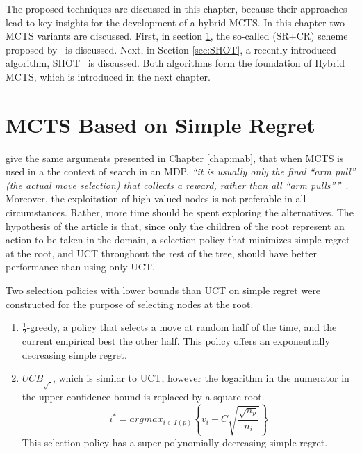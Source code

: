\documentclass{kecsmstr}
\begin{document}
\vspace{2 mm}
The proposed techniques are discussed in this chapter, because their approaches lead to key insights for the development of a hybrid MCTS. In this chapter two MCTS variants are discussed. First, in section \ref{sec:srmcts}, the so-called (SR+CR) scheme proposed by~ is discussed. Next, in Section \ref{sec:SHOT}, a recently introduced algorithm, SHOT~ is discussed. Both algorithms form the foundation of Hybrid MCTS, which is introduced in the next chapter.
\newpage
\section{MCTS Based on Simple Regret}
\label{sec:srmcts}

 give the same arguments presented in Chapter \ref{chap:mab}, that when MCTS is used in a the context of search in an MDP, \emph{``it is usually only the final ``arm pull'' (the actual move selection) that collects a reward, rather than all ``arm pulls''''}~. Moreover, the exploitation of high valued nodes is not preferable in all circumstances. Rather, more time should be spent exploring the alternatives. The hypothesis of the article is that, since only the children of the root represent an action to be taken in the domain, a selection policy that minimizes simple regret at the root, and UCT throughout the rest of the tree, should have better performance than using only UCT.

Two selection policies with lower bounds than UCT on simple regret were constructed for the purpose of selecting nodes at the root.
\begin{enumerate}
\item $\frac{1}{2}$-greedy, a policy that selects a move at random half of the time, and the current empirical best the other half. This policy offers an exponentially decreasing simple regret.
\item ${UCB}_{\sqrt{.}}$, which is similar to UCT, however the logarithm in the numerator in the upper confidence bound is replaced by a square root.
\begin{equation}
\label{eq:uctsqrt}
i^* = argmax_{i \in I(p)}\left\{ v_i + C \sqrt{ \frac{\sqrt{n_p}}{n_i}}\right\}
\end{equation}
This selection policy has a super-polynomially decreasing simple regret.
\end{enumerate}
\end{document}
